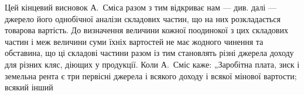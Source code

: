 Цей кінцевий висновок А.~Сміса разом з тим відкриває нам — див.
далі — джерело його однобічної аналізи складових частин, що на них
розкладається товарова вартість. До визначення величини кожної поодинокої
з цих складових частин і меж величини суми їхніх вартостей не має
жодного чинення та обставина, що ці складові частини разом із тим
становлять різні джерела доходу для різних кляс, діющих у продукції.
Коли А.~Сміс каже: „Заробітна плата, зиск і земельна рента є три первісні
джерела і всякого доходу і всякої мінової вартости; всякий інший
\parbreak{}  %
